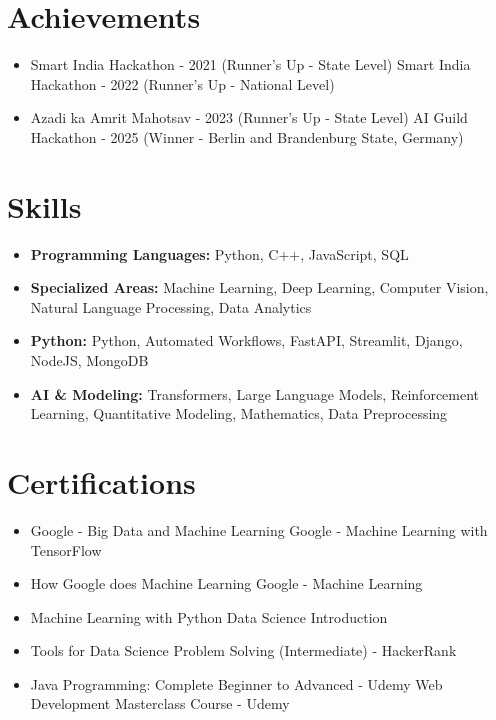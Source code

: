 \documentclass[a4paper,10pt]{article}
\begin{document}
\section*{Achievements}
\begin{itemize}
\item Smart India Hackathon - 2021 (Runner's Up - State Level) \hfill Smart India Hackathon - 2022 (Runner's Up - National Level)
\item Azadi ka Amrit Mahotsav - 2023 (Runner's Up - State Level) \hfill AI Guild Hackathon - 2025 (Winner - Berlin and Brandenburg State, Germany)
\end{itemize}

\section*{Skills}
\begin{itemize}
  \item \textbf{Programming Languages:} Python, C++, JavaScript, SQL
  \item \textbf{Specialized Areas:} Machine Learning, Deep Learning, Computer Vision, Natural Language Processing, Data Analytics
  \item \textbf{Python:} Python, Automated Workflows, FastAPI, Streamlit, Django, NodeJS, MongoDB
  \item \textbf{AI \& Modeling:} Transformers, Large Language Models, Reinforcement Learning, Quantitative Modeling, Mathematics, Data Preprocessing
\end{itemize}

\section*{Certifications}
\begin{itemize}
\item Google - Big Data and Machine Learning \hfill Google - Machine Learning with TensorFlow
\item How Google does Machine Learning \hfill Google - Machine Learning
\item Machine Learning with Python \hfill Data Science Introduction
\item Tools for Data Science \hfill Problem Solving (Intermediate) - HackerRank
\item Java Programming: Complete Beginner to Advanced - Udemy \hfill Web Development Masterclass Course - Udemy
\end{itemize}
\end{document}
